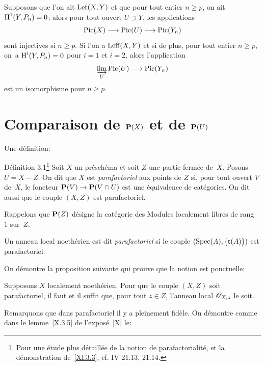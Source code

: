 \begin{corollaire} \label{XI.2.2} Supposons que l'on ait $\operatorname{Lef}(X, Y)$ et que pour tout entier $n\geq p$, on ait $\operatorname{H}^1(Y, P_n)=0$; alors pour tout ouvert $U\supset Y$, les applications
\[
\Pic(X)\to\Pic(U)\to\Pic(Y_n)
\]
sont injectives si $n\geq p$. Si l'on a $\operatorname{Leff}(X, Y)$ et si de plus, pour tout entier $n\geq p$, on~a $\operatorname{H}^i(Y, P_n)=0$ pour $i=1$ et $i=2$, alors l'application
\[
\varinjlim_U\Pic(U)\to\Pic(Y_n)
\]
est un isomorphisme pour $n\geq p$.
\end{corollaire}

\section{Comparaison de ${\mathbf P}(X)$ et de ${\mathbf P}(U)$} \label{XI.3}

Une d\'efinition:
\label{XI.3.1}
\begin{enonce*}[remark]{D\'efinition 3.1\footnote{Pour une \'etude plus d\'etaill\'ee de la notion de parafactorialit\'e, et la d\'emonstration de~\ref{XI.3.3}, cf. \EGA IV 21.13, 21.14.}}
Soit $X$ un pr\'esch\'ema et soit $Z$ une partie ferm\'ee de~$X$. Posons $U=X-Z$. On dit que $X$ est \emph{parafactoriel} aux points de $Z$ si, pour tout ouvert $V$ de~$X$, le foncteur $\PP(V)\to \PP(V\cap U)$ est une \'equivalence de cat\'egories. On dit aussi que le couple $(X, Z)$ est parafactoriel.
\end{enonce*}

Rappelons que ${\mathbf P}(Z)$ d\'esigne la cat\'egorie des Modules localement libres de rang~$1$ sur~$Z$.

\begin{definition} \label{XI.3.2}
Un anneau local noeth\'erien est dit \emph{parafactoriel} si le couple $(\operatorname{Spec}(A), \{\mathfrak{r}(A)\})$ est parafactoriel.
\end{definition}

On d\'emontre la proposition suivante qui prouve que la notion est \og ponctuelle\fg:

\begin{proposition} \label{XI.3.3}
Supposons $X$ localement noeth\'erien. Pour que le couple $(X, Z)$ soit parafactoriel, il faut et il suffit que, pour tout $z\in Z$, l'anneau local ${\mathscr O}_{X, z}$ le soit.
\end{proposition}

Remarquons que dans parafactoriel il y a \og pleinement fid\`ele\fg. On d\'emontre comme dans le lemme~\ref{X.3.5} de l'expos\'e~\ref{X} le:

